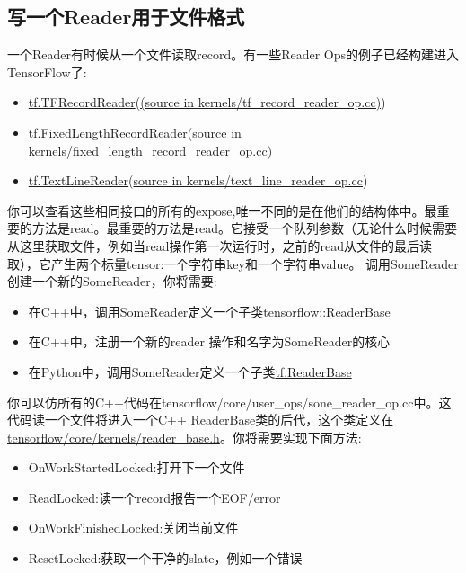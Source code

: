 \subsection{写一个Reader用于文件格式}
一个Reader有时候从一个文件读取record。有一些Reader Ops的例子已经构建进入TensorFlow了:
\begin{itemize}
	\item \href{https://www.tensorflow.org/api_docs/python/tf/TFRecordReader}{tf.TFRecordReader}(\href{https://www.github.com/tensorflow/tensorflow/blob/r1.4/tensorflow/core/kernels/tf_record_reader_op.cc}{(source in kernels/tf\_record\_reader\_op.cc)})
	\item \href{https://www.tensorflow.org/api_docs/python/tf/FixedLengthRecordReader}{tf.FixedLengthRecordReader}(\href{https://www.github.com/tensorflow/tensorflow/blob/r1.4/tensorflow/core/kernels/fixed_length_record_reader_op.cc}{source in kernels/fixed\_length\_record\_reader\_op.cc})
	\item \href{https://www.tensorflow.org/api_docs/python/tf/TextLineReader}{tf.TextLineReader}(\href{https://www.github.com/tensorflow/tensorflow/blob/r1.4/tensorflow/core/kernels/text_line_reader_op.cc}{source in kernels/text\_line\_reader\_op.cc})
\end{itemize}
你可以查看这些相同接口的所有的expose,唯一不同的是在他们的结构体中。最重要的方法是read。最重要的方法是read。它接受一个队列参数（无论什么时候需要从这里获取文件，例如当read操作第一次运行时，之前的read从文件的最后读取），它产生两个标量tensor:一个字符串key和一个字符串value。
调用SomeReader创建一个新的SomeReader，你将需要:
\begin{itemize}
	\item 在C++中，调用SomeReader定义一个子类\href{https://www.github.com/tensorflow/tensorflow/blob/r1.4/tensorflow/core/framework/reader_base.h}{tensorflow::ReaderBase}
	\item 在C++中，注册一个新的reader 操作和名字为SomeReader的核心
	\item 在Python中，调用SomeReader定义一个子类\href{https://www.tensorflow.org/api_docs/python/tf/ReaderBase}{tf.ReaderBase }
\end{itemize}
你可以仿所有的C++代码在tensorflow/core/user\_ops/sone\_reader\_op.cc中。这代码读一个文件将进入一个C++ ReaderBase类的后代，这个类定义在
\href{https://www.github.com/tensorflow/tensorflow/blob/r1.4/tensorflow/core/framework/reader_base.h}{tensorflow/core/kernels/reader\_base.h}。你将需要实现下面方法:
\begin{itemize}
	\item OnWorkStartedLocked:打开下一个文件
	\item ReadLocked:读一个record报告一个EOF/error
	\item OnWorkFinishedLocked:关闭当前文件
	\item ResetLocked:获取一个干净的slate，例如一个错误
\end{itemize}
